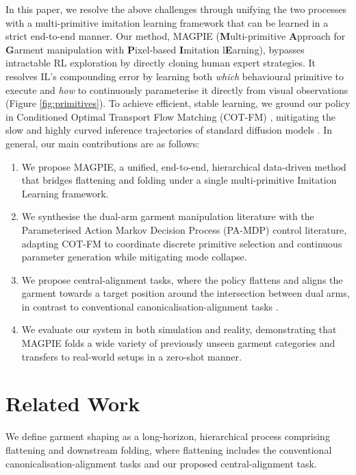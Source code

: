 \documentclass[journal]{IEEEtran}
\begin{document}
In this paper, we resolve the above challenges through unifying the two processes with a multi-primitive imitation learning framework that can be learned in a strict end-to-end manner. Our method, MAGPIE (\textbf{M}ulti-primitive \textbf{A}pproach for \textbf{G}arment manipulation with \textbf{P}ixel-based \textbf{I}mitation l\textbf{E}arning), bypasses intractable RL exploration by directly cloning human expert strategies. It resolves IL's compounding error by learning both \textit{which} behavioural primitive to execute and \textit{how} to continuously parameterise it directly from visual observations (Figure \ref{fig:primitives}). To achieve efficient, stable learning, we ground our policy in Conditioned Optimal Transport Flow Matching (COT-FM) \cite{lipman2022flow, black2024pi0}, mitigating the slow and highly curved inference trajectories of standard diffusion models \cite{chi2025diffusion}. In general, our main contributions are as follows:
\begin{enumerate}
    \item We propose MAGPIE, a unified, end-to-end, hierarchical data-driven method that bridges flattening and folding under a single multi-primitive Imitation Learning framework.

    \item We synthesise the dual-arm garment manipulation literature with the Parameterised Action Markov Decision Process (PA-MDP) control literature, adapting COT-FM to coordinate discrete primitive selection and continuous parameter generation while mitigating mode collapse.

    \item We propose central-alignment tasks, where the policy flattens and aligns the garment towards a target position around the intersection between dual arms, in contrast to conventional canonicalisation-alignment tasks \cite{avigal2022speedfolding, xue2023unifolding, canberk2022cloth}.

    \item We evaluate our system in both simulation and reality, demonstrating that MAGPIE folds a wide variety of previously unseen garment categories and transfers to real-world setups in a zero-shot manner.
\end{enumerate}


\section{Related Work}

We define garment shaping as a long-horizon, hierarchical process comprising flattening and downstream folding, where flattening includes the conventional canonicalisation-alignment tasks \cite{canberk2022cloth} and our proposed central-alignment task.
\end{document}
